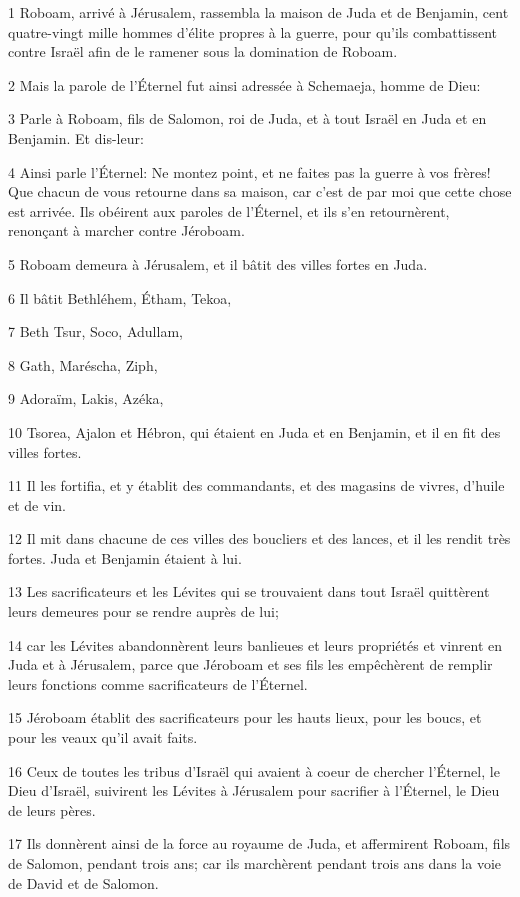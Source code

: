 \par 1 Roboam, arrivé à Jérusalem, rassembla la maison de Juda et de Benjamin, cent quatre-vingt mille hommes d'élite propres à la guerre, pour qu'ils combattissent contre Israël afin de le ramener sous la domination de Roboam.
\par 2 Mais la parole de l'Éternel fut ainsi adressée à Schemaeja, homme de Dieu:
\par 3 Parle à Roboam, fils de Salomon, roi de Juda, et à tout Israël en Juda et en Benjamin. Et dis-leur:
\par 4 Ainsi parle l'Éternel: Ne montez point, et ne faites pas la guerre à vos frères! Que chacun de vous retourne dans sa maison, car c'est de par moi que cette chose est arrivée. Ils obéirent aux paroles de l'Éternel, et ils s'en retournèrent, renonçant à marcher contre Jéroboam.
\par 5 Roboam demeura à Jérusalem, et il bâtit des villes fortes en Juda.
\par 6 Il bâtit Bethléhem, Étham, Tekoa,
\par 7 Beth Tsur, Soco, Adullam,
\par 8 Gath, Maréscha, Ziph,
\par 9 Adoraïm, Lakis, Azéka,
\par 10 Tsorea, Ajalon et Hébron, qui étaient en Juda et en Benjamin, et il en fit des villes fortes.
\par 11 Il les fortifia, et y établit des commandants, et des magasins de vivres, d'huile et de vin.
\par 12 Il mit dans chacune de ces villes des boucliers et des lances, et il les rendit très fortes. Juda et Benjamin étaient à lui.
\par 13 Les sacrificateurs et les Lévites qui se trouvaient dans tout Israël quittèrent leurs demeures pour se rendre auprès de lui;
\par 14 car les Lévites abandonnèrent leurs banlieues et leurs propriétés et vinrent en Juda et à Jérusalem, parce que Jéroboam et ses fils les empêchèrent de remplir leurs fonctions comme sacrificateurs de l'Éternel.
\par 15 Jéroboam établit des sacrificateurs pour les hauts lieux, pour les boucs, et pour les veaux qu'il avait faits.
\par 16 Ceux de toutes les tribus d'Israël qui avaient à coeur de chercher l'Éternel, le Dieu d'Israël, suivirent les Lévites à Jérusalem pour sacrifier à l'Éternel, le Dieu de leurs pères.
\par 17 Ils donnèrent ainsi de la force au royaume de Juda, et affermirent Roboam, fils de Salomon, pendant trois ans; car ils marchèrent pendant trois ans dans la voie de David et de Salomon.
